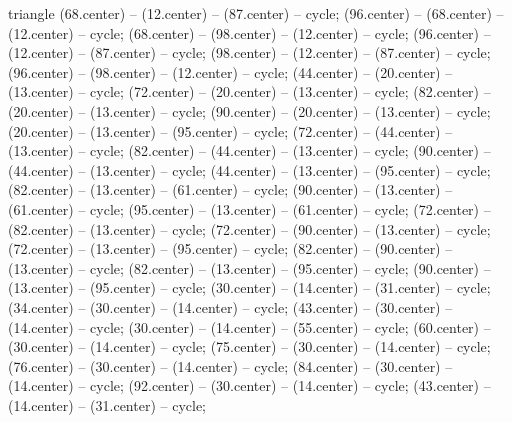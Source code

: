 \begin{pgfonlayer}{triangle}
 (68.center) -- (12.center) -- (87.center) -- cycle; 
 (96.center) -- (68.center) -- (12.center) -- cycle; 
 (68.center) -- (98.center) -- (12.center) -- cycle; 
 (96.center) -- (12.center) -- (87.center) -- cycle; 
 (98.center) -- (12.center) -- (87.center) -- cycle; 
 (96.center) -- (98.center) -- (12.center) -- cycle; 
 (44.center) -- (20.center) -- (13.center) -- cycle; 
 (72.center) -- (20.center) -- (13.center) -- cycle; 
 (82.center) -- (20.center) -- (13.center) -- cycle; 
 (90.center) -- (20.center) -- (13.center) -- cycle; 
 (20.center) -- (13.center) -- (95.center) -- cycle; 
 (72.center) -- (44.center) -- (13.center) -- cycle; 
 (82.center) -- (44.center) -- (13.center) -- cycle; 
 (90.center) -- (44.center) -- (13.center) -- cycle; 
 (44.center) -- (13.center) -- (95.center) -- cycle; 
 (82.center) -- (13.center) -- (61.center) -- cycle; 
 (90.center) -- (13.center) -- (61.center) -- cycle; 
 (95.center) -- (13.center) -- (61.center) -- cycle; 
 (72.center) -- (82.center) -- (13.center) -- cycle; 
 (72.center) -- (90.center) -- (13.center) -- cycle; 
 (72.center) -- (13.center) -- (95.center) -- cycle; 
 (82.center) -- (90.center) -- (13.center) -- cycle; 
 (82.center) -- (13.center) -- (95.center) -- cycle; 
 (90.center) -- (13.center) -- (95.center) -- cycle; 
 (30.center) -- (14.center) -- (31.center) -- cycle; 
 (34.center) -- (30.center) -- (14.center) -- cycle; 
 (43.center) -- (30.center) -- (14.center) -- cycle; 
 (30.center) -- (14.center) -- (55.center) -- cycle; 
 (60.center) -- (30.center) -- (14.center) -- cycle; 
 (75.center) -- (30.center) -- (14.center) -- cycle; 
 (76.center) -- (30.center) -- (14.center) -- cycle; 
 (84.center) -- (30.center) -- (14.center) -- cycle; 
 (92.center) -- (30.center) -- (14.center) -- cycle; 
 (43.center) -- (14.center) -- (31.center) -- cycle; 

\end{pgfonlayer}
